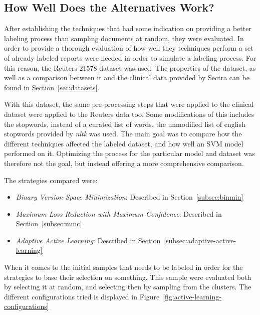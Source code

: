 \subsection{How Well Does the Alternatives Work?}

After establishing the techniques that had some indication on providing a better labeling process than sampling documents at random, they were evaluated.
In order to provide a thorough evaluation of how well they techniques perform a set of already labeled reports were needed in order to simulate a labeling process.
For this reason, the Reuters-21578 dataset was used.
The properties of the dataset, as well as a comparison between it and the clinical data provided by Sectra can be found in Section~\ref{sec:datasets}.

With this dataset, the same pre-processing steps that were applied to the clinical dataset were applied to the Reuters data too.
Some modifications of this includes the stopwords, instead of a curated list of words, the unmodified list of english stopwords provided by \textit{nltk} was used.
The main goal was to compare how the different techniques affected the labeled dataset, and how well an SVM model performed on it.
Optimizing the process for the particular model and dataset was therefore not the goal, but instead offering a more comprehensive comparison.

The strategies compared were: 
\begin{itemize}
    \item \textit{Binary Version Space Minimization}: Described in Section~\ref{subsec:binmin}
    \item \textit{Maximum Loss Reduction with Maximum Confidence}: Described in Section~\ref{subsec:mmc}
    \item \textit{Adaptive Active Learning}: Described in Section~\ref{subsec:adaptive-active-learning}
\end{itemize}

When it comes to the initial samples that needs to be labeled in order for the strategies to base their selection on something.
This sample were evaluated both by selecting it at random, and selecting then by sampling from the clusters.
The different configurations tried is displayed in Figure~\ref{fig:active-learning-configurations}

